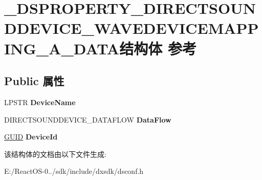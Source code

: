 \hypertarget{struct___d_s_p_r_o_p_e_r_t_y___d_i_r_e_c_t_s_o_u_n_d_d_e_v_i_c_e___w_a_v_e_d_e_v_i_c_e_m_a_p_p_i_n_g___a___d_a_t_a}{}\section{\+\_\+\+D\+S\+P\+R\+O\+P\+E\+R\+T\+Y\+\_\+\+D\+I\+R\+E\+C\+T\+S\+O\+U\+N\+D\+D\+E\+V\+I\+C\+E\+\_\+\+W\+A\+V\+E\+D\+E\+V\+I\+C\+E\+M\+A\+P\+P\+I\+N\+G\+\_\+\+A\+\_\+\+D\+A\+T\+A结构体 参考}
\label{struct___d_s_p_r_o_p_e_r_t_y___d_i_r_e_c_t_s_o_u_n_d_d_e_v_i_c_e___w_a_v_e_d_e_v_i_c_e_m_a_p_p_i_n_g___a___d_a_t_a}
\subsection*{Public 属性}
\begin{DoxyCompactItemize}
\item 
\mbox{\label{struct___d_s_p_r_o_p_e_r_t_y___d_i_r_e_c_t_s_o_u_n_d_d_e_v_i_c_e___w_a_v_e_d_e_v_i_c_e_m_a_p_p_i_n_g___a___d_a_t_a_add7ce970aadfd6a9b88bc545bb4e63a0}} 
L\+P\+S\+TR {\bfseries Device\+Name}
\item 
\mbox{\label{struct___d_s_p_r_o_p_e_r_t_y___d_i_r_e_c_t_s_o_u_n_d_d_e_v_i_c_e___w_a_v_e_d_e_v_i_c_e_m_a_p_p_i_n_g___a___d_a_t_a_aea92c2d4a398f6314ecdd7b694d33d7c}} 
D\+I\+R\+E\+C\+T\+S\+O\+U\+N\+D\+D\+E\+V\+I\+C\+E\+\_\+\+D\+A\+T\+A\+F\+L\+OW {\bfseries Data\+Flow}
\item 
\mbox{\label{struct___d_s_p_r_o_p_e_r_t_y___d_i_r_e_c_t_s_o_u_n_d_d_e_v_i_c_e___w_a_v_e_d_e_v_i_c_e_m_a_p_p_i_n_g___a___d_a_t_a_a28fe318d203f538f6aaf094fee004b5e}} 
\hyperlink{interface_g_u_i_d}{G\+U\+ID} {\bfseries Device\+Id}
\end{DoxyCompactItemize}


该结构体的文档由以下文件生成\+:\begin{DoxyCompactItemize}
\item 
E\+:/\+React\+O\+S-\/0../sdk/include/dxsdk/dsconf.\+h\end{DoxyCompactItemize}
